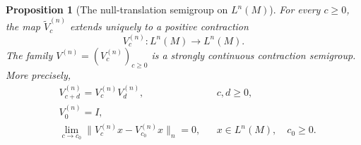 \documentclass[11pt,a4paper]{article}
\theoremstyle{plain}
\numberwithin{theorem}{section}
\newtheorem{proposition}[theorem]{Proposition}
\theoremstyle{definition}
\newcommand{\?}{\overset{?}{=}}
\begin{document}
\begin{proposition}[The null-translation semigroup on \(L^n(M)\)]
\label{prop:null-translation-Ln-semigroup}
For every \(c\geq0\), the map
\(\widetilde V_c^{(n)}\) extends uniquely to a positive contraction
\[
        V_c^{(n)}:L^n(M)\longrightarrow L^n(M).
\]
The family \(V^{(n)}=(V_c^{(n)})_{c\geq0}\) is a strongly continuous
contraction semigroup.  More precisely,
\begin{align}
        &V_{c+d}^{(n)}
        =
        V_c^{(n)}V_d^{(n)},
        &&c,d\geq0,                                      \label{eq:V-semigroup}\\
        &V_0^{(n)}
        =
        I,                                                \label{eq:V-identity}\\
        &\lim_{c\to c_0}
        \|V_c^{(n)}x-V_{c_0}^{(n)}x\|_n
        =
        0,
        &&x\in L^n(M),\quad c_0\geq0.                    \label{eq:V-strong-cont}
\end{align}
\end{proposition}
\end{document}
